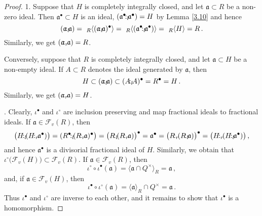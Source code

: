 \documentclass[a4paper]{amsart}
\theoremstyle{definition}
\numberwithin{equation}{section}
\begin{document}
\begin{proof}
1. Suppose that $H$ is completely integrally closed, and let
$\mathfrak a \subset R$ be a non-zero ideal. Then $\mathfrak
a^{\bullet} \subset H$ is an ideal,  $(\mathfrak a^{\bullet} {\negthinspace :_l \negthinspace}
\mathfrak a^{\bullet})  = H$ by Lemma \ref{3.10} and hence
\[
(\mathfrak a {\negthinspace :_l \negthinspace} \mathfrak a) = \ _R\langle (\mathfrak a {\negthinspace :_l \negthinspace}
\mathfrak a)^{\bullet} \rangle = \ _R\langle ( \mathfrak a^{\bullet}
{\negthinspace :_l \negthinspace}  \mathfrak a^{\bullet}) \rangle = \ _R\langle H \rangle = R \,.
\]
Similarly, we get $(\mathfrak a {\negthinspace :_r \negthinspace} \mathfrak a) = R$.

Conversely, suppose that $R$ is completely integrally closed, and
let $\mathfrak a \subset H$ be a non-empty ideal. If $A \subset R$ denotes
the  ideal generated by $\mathfrak a$, then
\[
H \subset ( \mathfrak a {\negthinspace :_l \negthinspace} \mathfrak a) \subset  (A {\negthinspace :_l \negthinspace}
A)^{\bullet} = R^{\bullet} = H \,.
\]
Similarly, we get $(\mathfrak a {\negthinspace :_r \negthinspace} \mathfrak a) = H$.

. Clearly, $\iota^{\bullet}$ and $\iota^{\circ}$ are inclusion
preserving and map fractional ideals to fractional ideals. If
$\mathfrak a \in \mathcal F_v (R)$, then
\[
\big( H {\negthinspace :_l \negthinspace} (H {\negthinspace :_r \negthinspace} \mathfrak a^{\bullet}) \big) = ( R^{\bullet}
{\negthinspace :_l \negthinspace} (R {\negthinspace :_r \negthinspace} \mathfrak a)^{\bullet} \big) = \big( R {\negthinspace :_l \negthinspace} (R {\negthinspace :_r \negthinspace}
\mathfrak a) \big)^{\bullet} = \mathfrak a^{\bullet} = \big( R {\negthinspace :_r \negthinspace}
(R {\negthinspace :_l \negthinspace} \mathfrak a) \big)^{\bullet} = \big( H {\negthinspace :_r \negthinspace} (H {\negthinspace :_l \negthinspace}
\mathfrak a^{\bullet}) \big) \,,
\]
and hence $\mathfrak a^{\bullet}$ is a divisorial fractional ideal
of $H$. Similarly, we obtain that $\iota^{\circ} \big( \mathcal F_v
(H) \big) \subset \mathcal F_v (R)$. If $\mathfrak a \in \mathcal
F_v (R)$, then
\[
\iota^{\circ} \circ \iota^{\bullet} ( \mathfrak a) = \langle
\mathfrak a \cap Q^{\times} \rangle_R = \mathfrak a \,,
\]
and, if $\mathfrak a \in \mathcal F_v (H)$, then
\[
\iota^{\bullet} \circ \iota^{\circ} ( \mathfrak a) = \langle
\mathfrak a \rangle_R \cap Q^{\times} = \mathfrak a \,.
\]
Thus $\iota^{\bullet}$ and $\iota^{\circ}$ are inverse to each
other, and it remains to show that $\iota^{\bullet}$ is a
homomorphism.


\end{proof}
\end{document}
